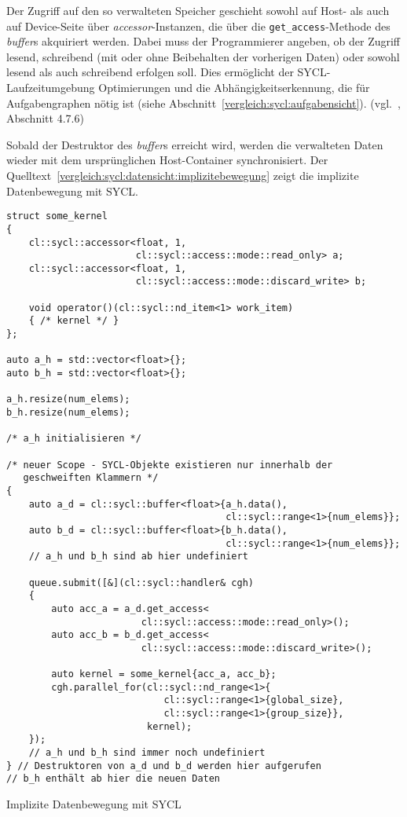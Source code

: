 Der Zugriff auf den so verwalteten Speicher geschieht sowohl auf Host- als auch
auf Device-Seite über \textit{accessor}-Instanzen, die über die
\texttt{get\_access}-Methode des \textit{buffer}s akquiriert werden. Dabei
muss der Programmierer angeben, ob der Zugriff lesend, schreibend (mit oder ohne
Beibehalten der vorherigen Daten) oder sowohl lesend als auch schreibend
erfolgen soll. Dies ermöglicht der SYCL-Laufzeitumgebung Optimierungen und die
Abhängigkeitserkennung, die für Aufgabengraphen nötig ist (siehe
Abschnitt~\ref{vergleich:sycl:aufgabensicht}).
(vgl.~\cite{syclspec}, Abschnitt 4.7.6)

Sobald der Destruktor des \textit{buffer}s erreicht wird, werden die verwalteten
Daten wieder mit dem ursprünglichen Host-Container synchronisiert. Der
Quelltext~\ref{vergleich:sycl:datensicht:implizitebewegung} zeigt die implizite
Datenbewegung mit SYCL.

\begin{code}
    \begin{verbatim}
struct some_kernel
{
    cl::sycl::accessor<float, 1,
                       cl::sycl::access::mode::read_only> a;
    cl::sycl::accessor<float, 1,
                       cl::sycl::access::mode::discard_write> b;

    void operator()(cl::sycl::nd_item<1> work_item)
    { /* kernel */ }
};

auto a_h = std::vector<float>{};
auto b_h = std::vector<float>{};

a_h.resize(num_elems);
b_h.resize(num_elems);

/* a_h initialisieren */

/* neuer Scope - SYCL-Objekte existieren nur innerhalb der
   geschweiften Klammern */
{
    auto a_d = cl::sycl::buffer<float>{a_h.data(),
                                       cl::sycl::range<1>{num_elems}};
    auto b_d = cl::sycl::buffer<float>{b_h.data(),
                                       cl::sycl::range<1>{num_elems}};
    // a_h und b_h sind ab hier undefiniert

    queue.submit([&](cl::sycl::handler& cgh)
    {
        auto acc_a = a_d.get_access<
                        cl::sycl::access::mode::read_only>();
        auto acc_b = b_d.get_access<
                        cl::sycl::access::mode::discard_write>();

        auto kernel = some_kernel{acc_a, acc_b};
        cgh.parallel_for(cl::sycl::nd_range<1>{
                            cl::sycl::range<1>{global_size},
                            cl::sycl::range<1>{group_size}},
                         kernel);
    });
    // a_h und b_h sind immer noch undefiniert
} // Destruktoren von a_d und b_d werden hier aufgerufen
// b_h enthält ab hier die neuen Daten
    \end{verbatim}
    \caption{Implizite Datenbewegung mit SYCL}
    \label{vergleich:sycl:datensicht:implizitebewegung}
\end{code}

